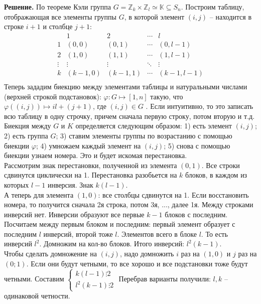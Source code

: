 \documentclass[a4paper, 12pt]{article}
\newcommand{\Z}{\mathbb{Z}}
\newcommand{\x}{\times}
\begin{document}
\begin{spacing}{1}
\noindent \textbf{Решение.} По теореме Кэли группа $G= \Z_k\x\Z_l \simeq \mathbb{K}\subseteq S_n$. Построим таблицу, отображающая все элементы группы $G$, в которой элемент $(i, j)$ -- находится в строке $i + 1$ и столбце $j + 1$:
$$
\begin{array}{c|cccc}
  & 1 & 2 & \cdots & l\\
  \hline
1 & (0, 0) & (0, 1) & \cdots & (0, l - 1)\\
2 & (1, 0) & (1, 1) & \cdots & (1, l - 1)\\
\vdots & \vdots & \vdots & \ddots &\vdots \\
k & (k - 1, 0) & (k - 1, 1) & \cdots & (k - 1, l - 1)\\
\end{array}
$$
Теперь зададим биекцию между элементами таблицы и натуральными числами (верхней строкой подстановок): $\varphi:G\mapsto [1, n]$ такую, что $\varphi((i, j))\mapsto il + (j + 1)$, где $(i, j)\in G$ . Если интуитивно, то это записать всю таблицу в одну строчку, причем сначала первую строку, потом вторую и т.д.\\ Биекция между $G$ и $K$ определяется следующим образом: 1) есть элемент $(i,j)$; 2) есть группа $G$; 3) ставим элементы группы по возрастанию с помощью биекции $\varphi$; 4) умножаем каждый элемент на $(i, j)$; 5) снова с помощью биекции узнаем номера. Это и будет искомая перестановка.\\
Рассмотрим знак перестановки, полученной из элемента $(0, 1)$. Все строки сдвинутся циклически на 1. Перестановка разобьется на $k$ блоков, в каждом из которых $l- 1$ инверсия. Знак $k(l - 1)$.\\ А теперь для элемента $(1, 0)$: все столбцы сдвинутся на 1. Если восстановить номера, то получится сначала 2я строка, потом 3я, ..., далее 1я. Между строками инверсий нет. Инверсии образуют все первые $k - 1$ блоков с последним. Посчитаем между первым блоком и последним: первый элемент образует с последним $l$ инверсий, второй тоже $l$. Элементов всего в блоке $l$. То есть инверсий $l^2$. Домножим на кол-во блоков. Итого инверсий: $l^2(k - 1)$.\\
Чтобы сделать домножение на $(i, j)$, надо домножить $i$ раз на $(1, 0)$ и $j$ раз на $(0; 1)$. Если они будут четными, то все хорошо и все подстановки тоже будут четными. Составим $\begin{cases}
k(l - 1) \vdots 2\\
l^2(k - 1) \vdots 2
\end{cases} $ Перебрав варианты получили: $l,k$ -- одинаковой четности.


\end{spacing}
\end{document}
